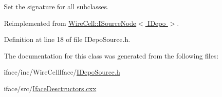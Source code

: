 Set the signature for all subclasses. 



Reimplemented from \hyperlink{class_wire_cell_1_1_i_source_node_a9361f7cad35e087800c5e59f27939977}{Wire\+Cell\+::\+I\+Source\+Node$<$ I\+Depo $>$}.



Definition at line 18 of file I\+Depo\+Source.\+h.



The documentation for this class was generated from the following files\+:\begin{DoxyCompactItemize}
\item 
iface/inc/\+Wire\+Cell\+Iface/\hyperlink{_i_depo_source_8h}{I\+Depo\+Source.\+h}\item 
iface/src/\hyperlink{_iface_desctructors_8cxx}{Iface\+Desctructors.\+cxx}\end{DoxyCompactItemize}
